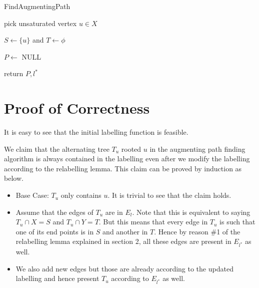 \begin{algorithm}[!h]
\caption{FindAugmentingPath}

pick unsaturated vertex $u \in X$

$S \leftarrow \{u\}$ and $T \leftarrow \phi$

$P \leftarrow$ NULL

return $P, l^*$
\end{algorithm}

\section{Proof of Correctness}
It is easy to see that the initial labelling function is feasible. 

We claim that the alternating tree $T_u$ rooted $u$ in the augmenting path finding algorithm is always contained in the labelling even after we modify the labelling according to the relabelling lemma. This claim can be proved by induction as below.
\begin{itemize}
    \item Base Case: $T_u$ only contains $u$. It is trivial to see that the claim holds.
    \item Assume that the edges of $T_u$ are in $E_l$. Note that this is equivalent to saying $T_u \cap X = S$ and $T_u \cap Y = T$. But this means that every edge in $T_u$ is such that one of its end points is in $S$ and another in $T$. Hence by reason \#1 of the relabelling lemma explained in section 2, all these edges are present in $E_{l^*}$ as well.
    \item We also add new edges but those are already according to the updated labelling and hence present $T_u$ according to $E_{l^*}$ as well.
\end{itemize}

